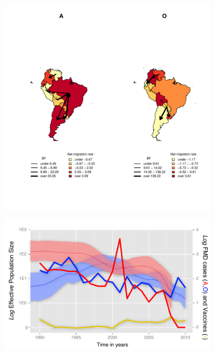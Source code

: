 \documentclass[10pt]{article}
\begin{document}
\begin{figure}[!ht]
\begin{center}
\includegraphics[scale=.85]{FIGURES/compound.pdf}
\end{center}
\caption{}
\label{fig:mj&BFs}
\end{figure}
\newpage
\begin{figure}[!ht]
\begin{center}
\includegraphics[scale=1.0]{FIGURES/skyride.pdf}
\end{center}
\caption{}
\label{fig:skyride}
\end{figure}
\newpage
\end{document}

